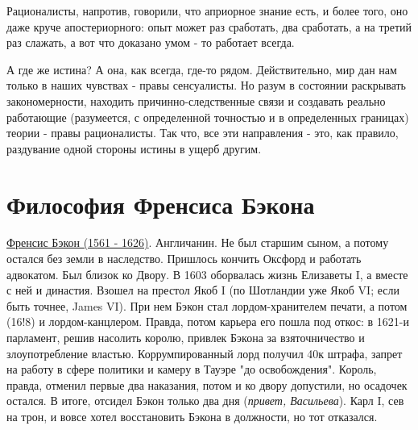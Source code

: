 Рационалисты, напротив, говорили, что априорное знание есть, и более того, оно даже круче апостериорного: опыт может раз сработать, два сработать, а на третий раз слажать, а вот что доказано умом - то работает всегда.

А где же истина? А она, как всегда, где-то рядом. Действительно, мир дан нам только в наших чувствах - правы сенсуалисты. Но разум в состоянии раскрывать закономерности, находить причинно-следственные связи и создавать реально работающие (разумеется, с определенной точностью и в определенных границах) теории - правы рационалисты. Так что, все эти направления - это, как правило, раздувание одной стороны истины в ущерб другим.

\section{Философия Френсиса Бэкона}
\underline{Френсис Бэкон (1561 - 1626)}. Англичанин. Не был старшим сыном, а потому остался без земли в наследство. Пришлось кончить Оксфорд и работать адвокатом. Был близок ко Двору. В 1603 оборвалась жизнь Елизаветы I, а вместе с ней и династия. Взошел на престол Якоб I (по Шотландии уже Якоб VI; если быть точнее, James VI). При нем Бэкон стал лордом-хранителем печати, а потом (16!8) и лордом-канцлером. Правда, потом карьера его пошла под откос: в 1621-и парламент, решив насолить королю, привлек Бэкона за взяточничество и злоупотребление властью. Коррумпированный лорд получил 40к штрафа, запрет на работу в сфере политики и камеру в Тауэре "до освобождения". Король, правда, отменил первые два наказания, потом и ко двору допустили, но осадочек остался. В итоге, отсидел Бэкон только два дня (\textit{привет, Васильева}). Карл I, сев на трон, и вовсе хотел восстановить Бэкона в должности, но тот отказался.

